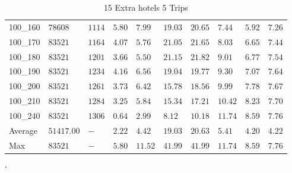 \begin{center}
\begin{table}[]
\begin{tabular}{|lll|l|l|ll|lll|}
100\_160 & $78608   $  & $1114$ & $5.80$ & $7.99 $  & $19.03$    & $20.65$   & $7.44 $& $5.92$   & $7.26$ \\
100\_170 & $83521   $  & $1164$ & $4.07$ & $5.76 $  & $21.05$    & $21.65$   & $8.03 $& $6.65$   & $7.44$ \\
100\_180 & $83521   $  & $1201$ & $3.66$ & $5.50 $  & $21.15$    & $21.82$   & $9.01 $& $6.77$   & $7.54$ \\
100\_190 & $83521   $  & $1234$ & $4.16$ & $6.56 $  & $19.04$    & $19.77$   & $9.30 $& $7.07$   & $7.64$ \\
100\_200 & $83521   $  & $1261$ & $3.73$ & $6.42 $  & $15.78$    & $18.56$   & $9.99 $& $7.78$   & $7.67$ \\
100\_210 & $83521   $  & $1284$ & $3.25$ & $5.84 $  & $15.34$    & $17.21$   & $10.42$& $8.23$   & $7.70$ \\
100\_240 & $83521   $  & $1306$ & $0.64$ & $2.99 $  & $8.12$    & $10.18$   & $11.74$& $8.59$   & $7.76$ \\
\hline
Average  & $51417.00$  & $-   $ & $2.22$ & $4.42 $  & $19.03$    & $20.63$   & $5.41 $& $4.20$   & $4.22$ \\
Max      & $83521   $  & $-   $ & $5.80$ & $11.52$  & $41.99$    & $41.99$   & $11.74$& $8.59$   & $7.76$ \\
\hline
\end{tabular}
\caption{15 Extra hotels 5 Trips}
\label{15-5}
\end{table}
\end{center}
`
